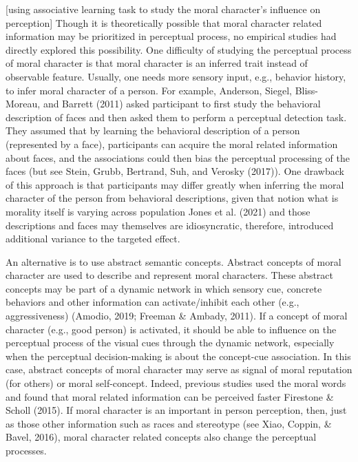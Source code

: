 \documentclass[
  english,
  man]{apa6}
\begin{document}
{[}using associative learning task to study the moral character's influence on perception{]} Though it is theoretically possible that moral character related information may be prioritized in perceptual process, no empirical studies had directly explored this possibility. One difficulty of studying the perceptual process of moral character is that moral character is an inferred trait instead of observable feature. Usually, one needs more sensory input, e.g., behavior history, to infer moral character of a person. For example, Anderson, Siegel, Bliss-Moreau, and Barrett (2011) asked participant to first study the behavioral description of faces and then asked them to perform a perceptual detection task. They assumed that by learning the behavioral description of a person (represented by a face), participants can acquire the moral related information about faces, and the associations could then bias the perceptual processing of the faces (but see Stein, Grubb, Bertrand, Suh, and Verosky (2017)). One drawback of this approach is that participants may differ greatly when inferring the moral character of the person from behavioral descriptions, given that notion what is morality itself is varying across population Jones et al. (2021) and those descriptions and faces may themselves are idiosyncratic, therefore, introduced additional variance to the targeted effect.

An alternative is to use abstract semantic concepts. Abstract concepts of moral character are used to describe and represent moral characters. These abstract concepts may be part of a dynamic network in which sensory cue, concrete behaviors and other information can activate/inhibit each other (e.g., aggressiveness) (Amodio, 2019; Freeman \& Ambady, 2011). If a concept of moral character (e.g., good person) is activated, it should be able to influence on the perceptual process of the visual cues through the dynamic network, especially when the perceptual decision-making is about the concept-cue association. In this case, abstract concepts of moral character may serve as signal of moral reputation (for others) or moral self-concept. Indeed, previous studies used the moral words and found that moral related information can be perceived faster Firestone \& Scholl (2015). If moral character is an important in person perception, then, just as those other information such as races and stereotype (see Xiao, Coppin, \& Bavel, 2016), moral character related concepts also change the perceptual processes.
\end{document}
